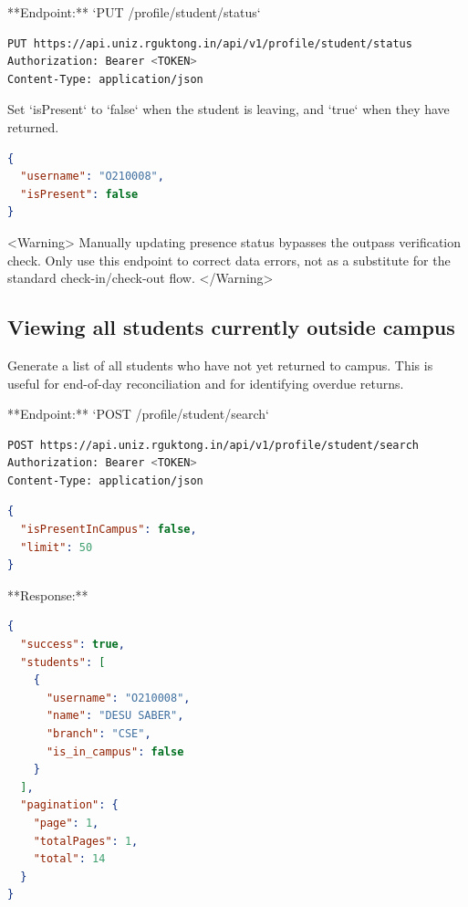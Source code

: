 **Endpoint:** `PUT /profile/student/status`

\begin{lstlisting}[language=bash]
PUT https://api.uniz.rguktong.in/api/v1/profile/student/status
Authorization: Bearer <TOKEN>
Content-Type: application/json

\end{lstlisting}

Set `isPresent` to `false` when the student is leaving, and `true` when they have returned.

\begin{lstlisting}[language=json]
{
  "username": "O210008",
  "isPresent": false
}

\end{lstlisting}

<Warning>
  Manually updating presence status bypasses the outpass verification check.
  Only use this endpoint to correct data errors, not as a substitute for the
  standard check-in/check-out flow.
</Warning>

\subsection{Viewing all students currently outside campus}

Generate a list of all students who have not yet returned to campus. This is useful for end-of-day reconciliation and for identifying overdue returns.

**Endpoint:** `POST /profile/student/search`

\begin{lstlisting}[language=bash]
POST https://api.uniz.rguktong.in/api/v1/profile/student/search
Authorization: Bearer <TOKEN>
Content-Type: application/json

\end{lstlisting}

\begin{lstlisting}[language=json]
{
  "isPresentInCampus": false,
  "limit": 50
}

\end{lstlisting}

**Response:**

\begin{lstlisting}[language=json]
{
  "success": true,
  "students": [
    {
      "username": "O210008",
      "name": "DESU SABER",
      "branch": "CSE",
      "is_in_campus": false
    }
  ],
  "pagination": {
    "page": 1,
    "totalPages": 1,
    "total": 14
  }
}

\end{lstlisting}

